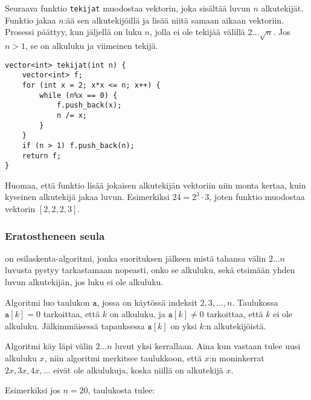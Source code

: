\noindent
Seuraava funktio \texttt{tekijat} muodostaa
vektorin, joka sisältää luvun $n$
alkutekijät.
Funktio jakaa $n$:ää sen alkutekijöillä ja lisää
niitä samaan aikaan vektoriin.
Prosessi päättyy, kun jäljellä on luku $n$,
jolla ei ole tekijää välillä $2 \ldots \sqrt n$.
Jos $n>1$, se on alkuluku ja viimeinen tekijä.

\begin{lstlisting}
vector<int> tekijat(int n) {
    vector<int> f;
    for (int x = 2; x*x <= n; x++) {
        while (n%x == 0) {
            f.push_back(x);
            n /= x;
        }
    }
    if (n > 1) f.push_back(n);
    return f;
}
\end{lstlisting}

Huomaa, että funktio lisää jokaisen
alkutekijän vektoriin
niin monta kertaa, kuin kyseinen
alkutekijä jakaa luvun.
Esimerkiksi $24=2^3 \cdot 3$,
joten funktio muodostaa vektorin $[2,2,2,3]$.

\subsubsection{Eratostheneen seula}


 on esilaskenta-algoritmi,
jonka suorituksen jälkeen mistä tahansa
välin $2 \ldots n$ luvusta pystyy tarkastamaan
nopeasti, onko se alkuluku,
sekä etsimään yhden luvun alkutekijän,
jos luku ei ole alkuluku.

Algoritmi luo taulukon $\texttt{a}$,
jossa on käytössä indeksit $2,3,\ldots,n$.
Taulukossa $\texttt{a}[k]=0$ tarkoittaa,
että $k$ on alkuluku,
ja $\texttt{a}[k] \neq 0$ tarkoittaa,
että $k$ ei ole alkuluku.
Jälkimmäisessä tapauksessa $\texttt{a}[k]$
on yksi $k$:n alkutekijöistä.

Algoritmi käy läpi välin
$2 \ldots n$ luvut yksi kerrallaan.
Aina kun vastaan tulee uusi alkuluku $x$,
niin algoritmi merkitsee taulukkoon, että $x$:n moninkerrat
$2x,3x,4x,\ldots$ eivät ole alkulukuja,
koska niillä on alkutekijä $x$.

Esimerkiksi jos $n=20$,
taulukosta tulee:

